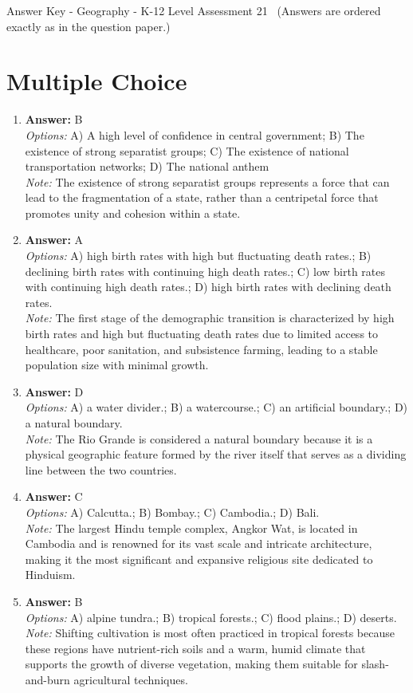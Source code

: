 \documentclass[12pt]{article}
\begin{document}
\begin{center}
Answer Key - Geography - K-12 Level Assessment 21 \
\small (Answers are ordered exactly as in the question paper.)
\end{center}

\section*{Multiple Choice}
\begin{enumerate}[label=\arabic*.]
\item \textbf{Answer:} B
\\ \textit{Options:} A) A high level of confidence in central government; B) The existence of strong separatist groups; C) The existence of national transportation networks; D) The national anthem
\\ \textit{Note:} The existence of strong separatist groups represents a force that can lead to the fragmentation of a state, rather than a centripetal force that promotes unity and cohesion within a state.
\item \textbf{Answer:} A
\\ \textit{Options:} A) high birth rates with high but fluctuating death rates.; B) declining birth rates with continuing high death rates.; C) low birth rates with continuing high death rates.; D) high birth rates with declining death rates.
\\ \textit{Note:} The first stage of the demographic transition is characterized by high birth rates and high but fluctuating death rates due to limited access to healthcare, poor sanitation, and subsistence farming, leading to a stable population size with minimal growth.
\item \textbf{Answer:} D
\\ \textit{Options:} A) a water divider.; B) a watercourse.; C) an artificial boundary.; D) a natural boundary.
\\ \textit{Note:} The Rio Grande is considered a natural boundary because it is a physical geographic feature formed by the river itself that serves as a dividing line between the two countries.
\item \textbf{Answer:} C
\\ \textit{Options:} A) Calcutta.; B) Bombay.; C) Cambodia.; D) Bali.
\\ \textit{Note:} The largest Hindu temple complex, Angkor Wat, is located in Cambodia and is renowned for its vast scale and intricate architecture, making it the most significant and expansive religious site dedicated to Hinduism.
\item \textbf{Answer:} B
\\ \textit{Options:} A) alpine tundra.; B) tropical forests.; C) flood plains.; D) deserts.
\\ \textit{Note:} Shifting cultivation is most often practiced in tropical forests because these regions have nutrient-rich soils and a warm, humid climate that supports the growth of diverse vegetation, making them suitable for slash-and-burn agricultural techniques.
\end{enumerate}
\end{document}
